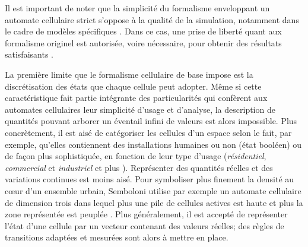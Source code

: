 \documentclass[12pt]{article}
\begin{document}
Il est important de noter que la simplicité du formalisme enveloppant
un automate cellulaire strict s'oppose à la qualité de la simulation,
notamment dans le cadre de modèles spécifiques
\cite{Torrens2001}. Dans ce cas, une prise de liberté quant aux
formalisme originel est autorisée, voire nécessaire, pour obtenir des
résultats satisfaisants \cite{White1998}.

La première limite que le formalisme cellulaire de base impose est la
discrétisation des états que chaque cellule peut adopter. Même si
cette caractéristique fait partie intégrante des particularités qui
confèrent aux automates cellulaires leur simplicité d'usage et
d'analyse, la description de quantités pouvant arborer un éventail
infini de valeurs est alors impossible. Plus concrètement, il est aisé
de catégoriser les cellules d'un espace selon le fait, par exemple,
qu'elles contiennent des installations humaines ou non (état booléen)
\cite{Benguigui2004,Cornu2008} ou de façon plus sophistiquée, en
fonction de leur type d'usage (\textit{résidentiel},
\textit{commercial} et \textit{industriel} \cite{Lechner} et plus
\cite{Dubos-Paillard2003}). Représenter des quantités réelles et des
variations continues est moins aisé. Pour symboliser plus finement la
densité au c\oe ur d'un ensemble urbain, Semboloni utilise par exemple
un automate cellulaire de dimension trois dans lequel plus une pile de
cellules actives est haute et plus la zone représentée est peuplée
\cite{Semboloni2000}. Plus généralement, il est accepté de représenter
l'état d'une cellule par un vecteur contenant des valeurs réelles; des
règles de transitions adaptées et mesurées sont alors à mettre en
place.
\end{document}
